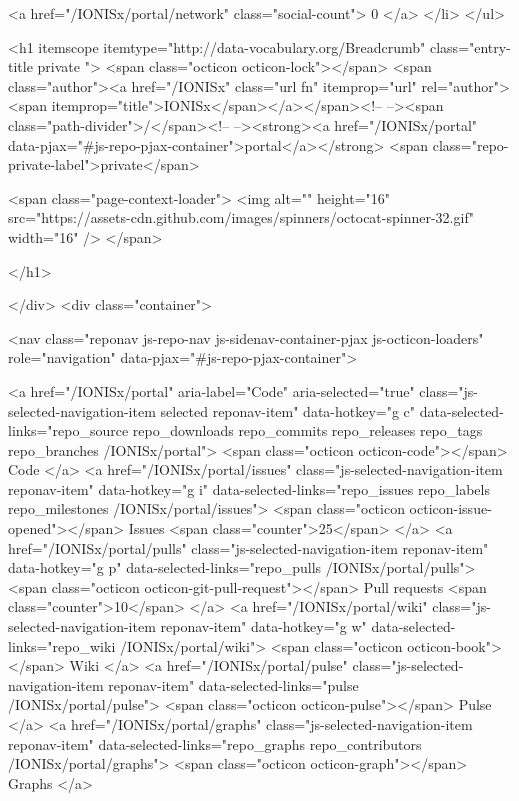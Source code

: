     <a href="/IONISx/portal/network" class="social-count">
      0
    </a>
  </li>
</ul>

    <h1 itemscope itemtype="http://data-vocabulary.org/Breadcrumb" class="entry-title private ">
  <span class="octicon octicon-lock"></span>
  <span class="author"><a href="/IONISx" class="url fn" itemprop="url" rel="author"><span itemprop="title">IONISx</span></a></span><!--
--><span class="path-divider">/</span><!--
--><strong><a href="/IONISx/portal" data-pjax="#js-repo-pjax-container">portal</a></strong>
    <span class="repo-private-label">private</span>

  <span class="page-context-loader">
    <img alt="" height="16" src="https://assets-cdn.github.com/images/spinners/octocat-spinner-32.gif" width="16" />
  </span>

</h1>

  </div>
  <div class="container">
    
<nav class="reponav js-repo-nav js-sidenav-container-pjax js-octicon-loaders"
     role="navigation"
     data-pjax="#js-repo-pjax-container">

  <a href="/IONISx/portal" aria-label="Code" aria-selected="true" class="js-selected-navigation-item selected reponav-item" data-hotkey="g c" data-selected-links="repo_source repo_downloads repo_commits repo_releases repo_tags repo_branches /IONISx/portal">
    <span class="octicon octicon-code"></span>
    Code
</a>
    <a href="/IONISx/portal/issues" class="js-selected-navigation-item reponav-item" data-hotkey="g i" data-selected-links="repo_issues repo_labels repo_milestones /IONISx/portal/issues">
      <span class="octicon octicon-issue-opened"></span>
      Issues
      <span class="counter">25</span>
</a>
  <a href="/IONISx/portal/pulls" class="js-selected-navigation-item reponav-item" data-hotkey="g p" data-selected-links="repo_pulls /IONISx/portal/pulls">
    <span class="octicon octicon-git-pull-request"></span>
    Pull requests
    <span class="counter">10</span>
</a>
    <a href="/IONISx/portal/wiki" class="js-selected-navigation-item reponav-item" data-hotkey="g w" data-selected-links="repo_wiki /IONISx/portal/wiki">
      <span class="octicon octicon-book"></span>
      Wiki
</a>
  <a href="/IONISx/portal/pulse" class="js-selected-navigation-item reponav-item" data-selected-links="pulse /IONISx/portal/pulse">
    <span class="octicon octicon-pulse"></span>
    Pulse
</a>
  <a href="/IONISx/portal/graphs" class="js-selected-navigation-item reponav-item" data-selected-links="repo_graphs repo_contributors /IONISx/portal/graphs">
    <span class="octicon octicon-graph"></span>
    Graphs
</a>

